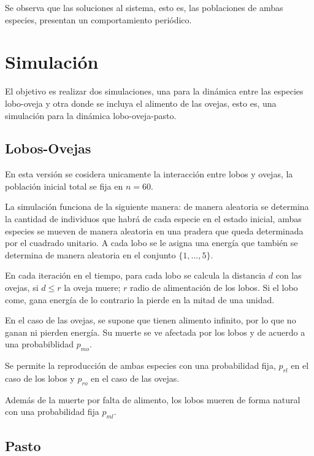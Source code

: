 \documentclass[12pt, twocolumn]{article}
\begin{document}
Se observa que las soluciones al sistema, esto es, las poblaciones de ambas especies, presentan un comportamiento peri\'odico.

\section{Simulaci\'on}
\label{sec:sim}

El objetivo es realizar dos simulaciones, una para la din\'amica entre las especies lobo-oveja y otra donde se incluya el alimento de las ovejas, esto es, una simulaci\'on para la din\'amica lobo-oveja-pasto.

\subsection{Lobos-Ovejas}
\label{subsec:lo}

En esta versi\'on se cosidera unicamente la interacci\'on entre lobos y ovejas, la poblaci\'on inicial total se fija en $n=60$. 

La simulaci\'on funciona de la siguiente manera: de manera aleatoria se determina la cantidad de individuos que habr\'a de cada especie en el estado inicial, ambas especies se mueven de manera aleatoria en una pradera que queda determinada por el cuadrado unitario. A cada lobo se le asigna una energ\'ia que tambi\'en se determina de manera aleatoria en el conjunto $\{1, ..., 5\}$. 

En cada iteraci\'on en el tiempo, para cada lobo se calcula la distancia $d$ con las ovejas, si $d \leq r$ la oveja muere; $r$ radio de alimentaci\'on de los lobos. Si el lobo come, gana energ\'ia de lo contrario la pierde en la mitad de una unidad.

En el caso de las ovejas, se supone que tienen alimento infinito, por lo que no ganan ni pierden energ\'ia. Su muerte se ve afectada por los lobos y de acuerdo a una probabiblidad $p_{mo}$.

Se permite la reproducci\'on de ambas especies con una probabilidad fija, $p_{rl}$ en el caso de los lobos y $p_{ro}$ en el caso de las ovejas. %

Adem\'as de la muerte por falta de alimento, los lobos mueren de forma natural con una probabilidad fija $p_{ml}$. 

\subsection{Pasto}
\label{subsec:pasto}
\end{document}

